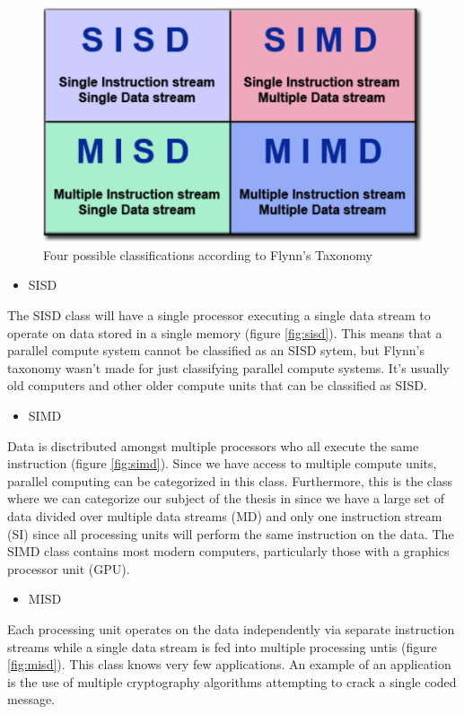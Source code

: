 \documentclass[a4paper, 11pt]{report}
\begin{document}
	\begin{figure}[h]
		\centering
		\includegraphics[scale=.5]{images/flynnsTaxonomy.pdf}
		\caption{Four possible classifications according to Flynn's Taxonomy}
		\label{fig:flynnTaxonomy}
	\end{figure}
	
	\begin{itemize}
		\item SISD
	\end{itemize}
The SISD class will have a single processor executing a single data stream to operate on data stored in a single memory (figure \ref{fig:sisd}). This means that a parallel compute system cannot be classified as an SISD sytem, but Flynn's taxonomy wasn't made for just classifying parallel compute systems. It's usually old computers and other older compute units that can be classified as SISD.
	
	\begin{itemize}
		\item SIMD
	\end{itemize}
Data is disctributed amongst multiple processors who all execute the same instruction (figure \ref{fig:simd}). Since we have access to multiple compute units, parallel computing can be categorized in this class. Furthermore, this is the class where we can categorize our subject of the thesis in since we have a large set of data divided over multiple data streams (MD) and only one instruction stream (SI) since all processing units will perform the same instruction on the data. The SIMD class contains most modern computers, particularly those with a graphics processor unit (GPU).

	\begin{itemize}
		\item MISD
	\end{itemize}
Each processing unit operates on the data independently via separate instruction streams while a single data stream is fed into multiple processing untis (figure \ref{fig:misd}). This class knows very few applications. An example of an application is the use of multiple cryptography algorithms attempting to crack a single coded message.
	
\end{document}
